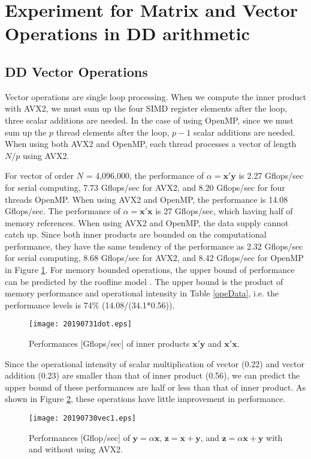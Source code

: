 \documentclass{IOS-Book-Article}
\begin{document}
\section{Experiment for Matrix and Vector Operations in DD arithmetic}
\subsection{DD Vector Operations}
Vector operations are single loop processing. 
When we compute the inner product with AVX2, we must sum up the four SIMD register elements after the loop, three scalar additions are needed.
In the case of using OpenMP, since we must sum up the $p$ thread elements after the loop, $p-1$ scalar additions are needed.
When using both AVX2 and OpenMP, each thread processes a vector of length $N/p$ using AVX2.

For vector of order $N$ = 4,096,000, the performance of $\alpha  = \bm{x}'\bm{y}$ is 2.27 Gflops/sec for serial computing, 7.73 Gflops/sec for AVX2, and 8.20 Gflops/sec for four threads OpenMP. When using AVX2 and OpenMP, the performance is 14.08 Gflops/sec.
The performance of $\alpha = \bm{x}'\bm{x}$ is 27 Gflops/sec, which having half of memory references. 
When using AVX2 and OpenMP, the data supply cannot catch up. 
Since both inner products are bounded on the computational performance, they have the same tendency of the performance as 2.32 Gflops/sec for serial computing, 8.68 Gflops/sec for AVX2, and 8.42 Gflops/sec for OpenMP in Figure \ref{xdot}.
For memory bounded operations, the upper bound of performance can be predicted by the roofline model \cite{roof}. The upper bound is the product of memory performance and operational intensity in Table \ref{opeData}, i.e. the performance levels is 74\% (14.08/(34.1*0.56)). 

\begin{figure}[htbp]
  \begin{center}
    \texttt{[image: 20190731dot.eps]}
    \caption{Performances [Gflops/sec] of inner products $\bm{x}'\bm{y}$ and $\bm{x}'\bm{x}$.}
    \label{xdot}
  \end{center}
\end{figure}

Since the operational intensity of scalar multiplication of vector (0.22) and vector addition (0.23) are smaller than that of inner product (0.56), we can predict the upper bound of these performances are half or less than that of inner product.
As shown in Figure \ref{xd}, these operations have little improvement in performance. 
\begin{figure}[htbp]
  \begin{center}
    \texttt{[image: 20190730vec1.eps]}
    \caption{Performances [Gflop/sec] of $\bm{y} = \alpha\bm{x}$, $\bm{z} = \bm{x} + \bm{y}$, and $\bm{z} = \alpha\bm{x} + \bm{y}$ with and without using AVX2.}
    \label{xd}
  \end{center}
\end{figure}
\end{document}
